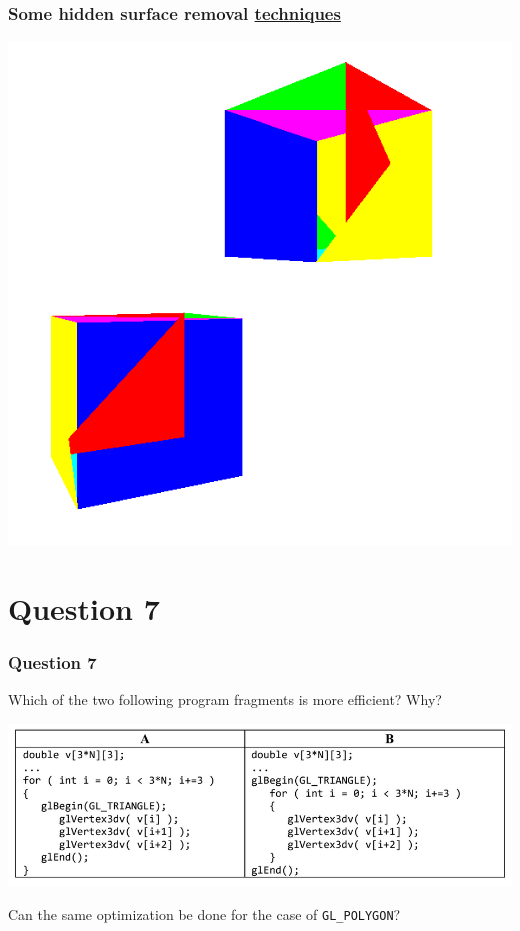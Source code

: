 \documentclass{beamer}
\begin{document}
\begin{frame}
    \frametitle{Some hidden surface removal \href{https://gabrielgambetta.com/computer-graphics-from-scratch/12-hidden-surface-removal.html}{techniques}}

    \begin{center}
        \includegraphics[scale=0.2]{hsr.png}
    \end{center}

\end{frame}

\section{Question 7}

\begin{frame}
    \frametitle{Question 7}
    Which of the two following program fragments is more efficient? Why?

    \begin{center}
        \includegraphics[scale=0.6]{q7.png}
    \end{center}

    Can the same optimization be done for the case of \texttt{GL\_POLYGON}?
\end{frame}
\end{document}
